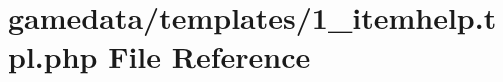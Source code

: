 \hypertarget{1__itemhelp_8tpl_8php}{\section{gamedata/templates/1\+\_\+itemhelp.tpl.\+php File Reference}
\label{1__itemhelp_8tpl_8php}
}
